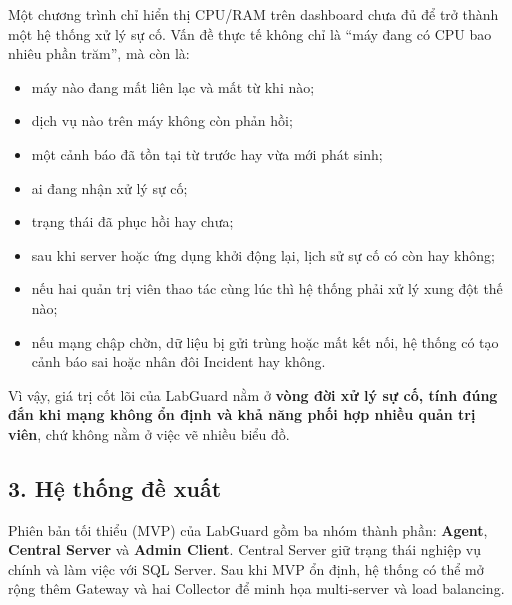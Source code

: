 Một chương trình chỉ hiển thị CPU/RAM trên dashboard chưa đủ để trở thành một hệ thống xử lý sự cố. Vấn đề thực tế không chỉ là ``máy đang có CPU bao nhiêu phần trăm'', mà còn là:
\begin{itemize}
    \item máy nào đang mất liên lạc và mất từ khi nào;
    \item dịch vụ nào trên máy không còn phản hồi;
    \item một cảnh báo đã tồn tại từ trước hay vừa mới phát sinh;
    \item ai đang nhận xử lý sự cố;
    \item trạng thái đã phục hồi hay chưa;
    \item sau khi server hoặc ứng dụng khởi động lại, lịch sử sự cố có còn hay không;
    \item nếu hai quản trị viên thao tác cùng lúc thì hệ thống phải xử lý xung đột thế nào;
    \item nếu mạng chập chờn, dữ liệu bị gửi trùng hoặc mất kết nối, hệ thống có tạo cảnh báo sai hoặc nhân đôi Incident hay không.
\end{itemize}

Vì vậy, giá trị cốt lõi của LabGuard nằm ở \textbf{vòng đời xử lý sự cố, tính đúng đắn khi mạng không ổn định và khả năng phối hợp nhiều quản trị viên}, chứ không nằm ở việc vẽ nhiều biểu đồ.

\subsection*{3. Hệ thống đề xuất}

Phiên bản tối thiểu (MVP) của LabGuard gồm ba nhóm thành phần: \textbf{Agent}, \textbf{Central Server} và \textbf{Admin Client}. Central Server giữ trạng thái nghiệp vụ chính và làm việc với SQL Server. Sau khi MVP ổn định, hệ thống có thể mở rộng thêm Gateway và hai Collector để minh họa multi-server và load balancing.

